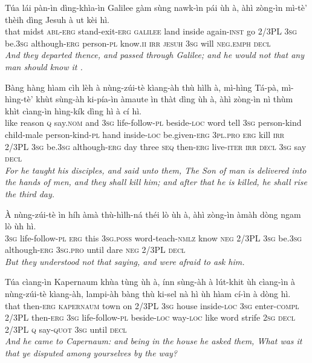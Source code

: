 \documentclass[11pt,a4paper]{article}
\begin{document}
\begin{exe}
\gll Túa lái pàn-ìn dìng-khìa-ìn Galilee gàm sùng nawk-ìn pái ùh à, àhì zòng-ìn mì-tè' thèih dìng Jesuh à ut kèi hì. \\
     that midst \textsc{abl}-\textsc{erg} stand-exit-\textsc{erg} \textsc{galilee} land inside again-\textsc{inst} go 2/3PL \textsc{3sg} be.\textsc{3sg} although-\textsc{erg} person-\textsc{pl} know.\textsc{ii} \textsc{irr} \textsc{jesuh} \textsc{3sg} will \textsc{neg}.\textsc{emph} \textsc{decl} \\
\glt \textcolor{kjvcolor}{\textit{And they departed thence, and passed through Galilee; and he would not that any man should know it .}}

\gll Bàng hàng hìam cìh lèh à nùng-zúi-tè kìang-àh thù hìlh à, mì-hìng Tá-pà, mì-hìng-tè' khùt sùng-àh ki-pía-ìn àmaute ìn thàt dìng ùh à, àhì zòng-ìn nì thùm khìt cìang-ìn hìng-kík dìng hì à cí hì. \\
     like reason \textsc{q} say.\textsc{nom} and \textsc{3sg} life-follow-\textsc{pl} beside-\textsc{loc} word tell \textsc{3sg} person-kind child-male person-kind-\textsc{pl} hand inside-\textsc{loc} be.given-\textsc{erg} \textsc{3pl}.\textsc{pro} \textsc{erg} kill \textsc{irr} 2/3PL \textsc{3sg} be.\textsc{3sg} although-\textsc{erg} day three \textsc{seq} then-\textsc{erg} live-\textsc{iter} \textsc{irr} \textsc{decl} \textsc{3sg} say \textsc{decl} \\
\glt \textcolor{kjvcolor}{\textit{For he taught his disciples, and said unto them, The Son of man is delivered into the hands of men, and they shall kill him; and after that he is killed, he shall rise the third day.}}

\gll À nùng-zúi-tè ìn híh àmà thù-hìlh-ná théi lò ùh à, àhì zòng-ìn àmàh dòng ngam lò ùh hì. \\
     \textsc{3sg} life-follow-\textsc{pl} \textsc{erg} this \textsc{3sg}.\textsc{poss} word-teach-\textsc{nmlz} know \textsc{neg} 2/3PL \textsc{3sg} be.\textsc{3sg} although-\textsc{erg} \textsc{3sg}.\textsc{pro} until dare \textsc{neg} 2/3PL \textsc{decl} \\
\glt \textcolor{kjvcolor}{\textit{But they understood not that saying, and were afraid to ask him.}}

\gll Túa cìang-ìn Kapernaum khùa tùng ùh à, ínn sùng-àh à lút-khit ùh cìang-ìn à nùng-zúi-tè kìang-àh, lampi-àh bàng thù ki-sel nà hì ùh hìam cí-ìn à dòng hì. \\
     that then-\textsc{erg} \textsc{kapernaum} town on 2/3PL \textsc{3sg} house inside-\textsc{loc} \textsc{3sg} enter-\textsc{compl} 2/3PL then-\textsc{erg} \textsc{3sg} life-follow-\textsc{pl} beside-\textsc{loc} way-\textsc{loc} like word strife \textsc{2sg} \textsc{decl} 2/3PL \textsc{q} say-\textsc{quot} \textsc{3sg} until \textsc{decl} \\
\glt \textcolor{kjvcolor}{\textit{And he came to Capernaum: and being in the house he asked them, What was it that ye disputed among yourselves by the way?}}


\end{exe}
\end{document}
